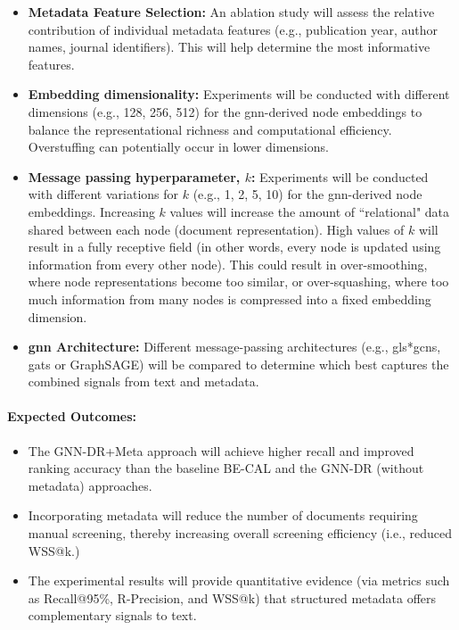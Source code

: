 \documentclass[10pt,oneside]{book}
\begin{document}
\begin{itemize} \item \textbf{Metadata Feature Selection:}
An ablation study will assess the relative contribution of individual metadata features (e.g., publication year, author names, journal identifiers). This will help determine the most informative features.

\item \textbf{Embedding dimensionality:}
Experiments will be conducted with different dimensions (e.g., 128, 256, 512) for the \gls*{gnn}-derived node embeddings to balance the representational richness and computational efficiency. Overstuffing can potentially occur in lower dimensions.

\item \textbf{Message passing hyperparameter, $k$:}
Experiments will be conducted with different variations for $k$ (e.g., 1, 2, 5, 10) for the \gls*{gnn}-derived node embeddings. Increasing $k$ values will increase the amount of ``relational" data shared between each node (document representation). High values of $k$ will result in a fully receptive field (in other words, every node is updated using information from every other node). This could result in over-smoothing, where node representations become too similar, or over-squashing, where too much information from many nodes is compressed into a fixed embedding dimension. 


\item \textbf{\gls*{gnn} Architecture:}
Different message-passing architectures (e.g., gls*{gcn}s, \gls*{gats} or GraphSAGE) will be compared to determine which best captures the combined signals from text and metadata. \end{itemize}

\paragraph{Expected Outcomes:}


\begin{itemize} 
\item The GNN-DR+Meta approach will achieve higher recall and improved ranking accuracy than the baseline BE-CAL and the GNN-DR (without metadata) approaches. 
\item Incorporating metadata will reduce the number of documents requiring manual screening, thereby increasing overall screening efficiency (i.e., reduced WSS@k.)
\item The experimental results will provide quantitative evidence (via metrics such as Recall@95\%, R-Precision, and WSS@k) that structured metadata offers complementary signals to text. 
\end{itemize}
\end{document}
